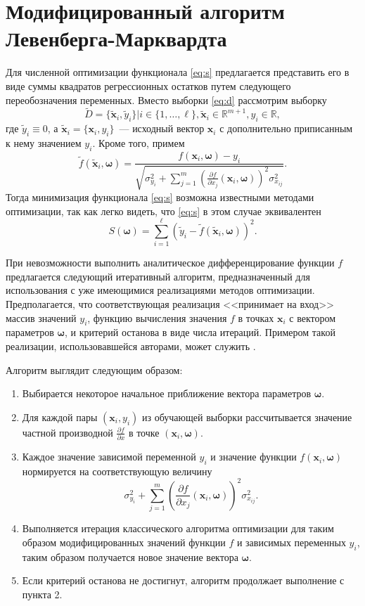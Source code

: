 \documentclass[11pt,a4paper]{article}
\newcommand{\bomega}{\boldsymbol{\omega}}
\begin{document}
\section{Модифицированный алгоритм Левенберга-Марквардта}

Для численной оптимизации функционала \eqref{eq:s} предлагается представить его в виде
суммы квадратов регрессионных остатков путем следующего переобозначения переменных.
Вместо выборки \eqref{eq:d}
рассмотрим выборку
\[
  \tilde{D} = \{ \tilde{\mathbf{x}}_i, \tilde{y}_i \} | i \in \{ 1, \dots, \ell \}, \tilde{\mathbf{x}}_i \in \mathbb{R}^{m + 1}, y_i \in \mathbb{R},
\]
где $\tilde{y}_i \equiv 0$, а
$\tilde{\mathbf{x}}_i = \{ \mathbf{x}_i, y_i \}$~--- исходный вектор $\mathbf{x}_i$
с дополнительно приписанным к нему значением $y_i$. Кроме того, примем
\[
  \tilde{f}(\tilde{\mathbf{x}}_i, \bomega) = \frac{f(\mathbf{x}_i, \bomega) - y_i}{\sqrt{\sigma_{y_i}^2 + \sum_{j = 1}^m (\frac{\partial f}{\partial x_j}(\mathbf{x}_i, \bomega))^2 \sigma^2_{x_{ij}}}}.
\]
Тогда минимизация функционала \eqref{eq:s} возможна известными методами оптимизации, так
как легко видеть, что \eqref{eq:s} в этом случае эквивалентен
\[
  S(\bomega) = \sum_{i = 1}^\ell (\tilde{y}_i - \tilde{f}(\tilde{\mathbf{x}}_i, \bomega))^2.
\]

При невозможности выполнить аналитическое дифференцирование функции $f$ предлагается
следующий итеративный алгоритм, предназначенный для использования с уже имеющимися
реализациями методов оптимизации. Предполагается, что соответствующая реализация
<<принимает на вход>> массив значений $y_i$,
функцию вычисления значения $f$ в точках $\mathbf{x}_i$ с вектором параметров $\bomega$,
и критерий останова в виде числа итераций. Примером такой реализации, использовавшейся
авторами, может служить \cite{dlib09}.

Алгоритм выглядит следующим образом:
\begin{enumerate}
  \item Выбирается некоторое начальное приближение вектора параметров $\bomega$.
  \item Для каждой пары $(\mathbf{x}_i, y_i)$ из обучающей выборки рассчитывается значение
	частной производной $\frac{\partial f}{\partial x}$ в точке $(\mathbf{x}_i, \bomega)$.
  \item Каждое значение зависимой переменной $y_i$ и значение функции $f(\mathbf{x}_i, \bomega)$
	нормируется на соответствующую величину
	\[
	  \sigma_{y_i}^2 + \sum_{j = 1}^m (\frac{\partial f}{\partial x_j}(\mathbf{x}_i, \bomega))^2 \sigma^2_{x_{ij}}.
	\]
  \item Выполняется итерация классического алгоритма оптимизации для таким образом
	модифицированных значений функции $f$ и зависимых переменных $y_i$, таким образом
	получается новое значение вектора $\bomega$.
  \item Если критерий останова не достигнут, алгоритм продолжает выполнение с пункта 2.
\end{enumerate}
\end{document}
